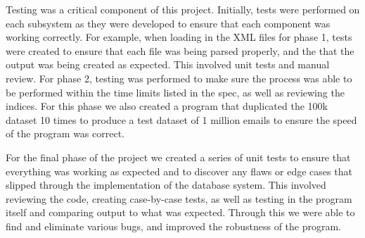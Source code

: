 Testing was a critical component of this project.  Initially, tests were performed on each subsystem as they were developed to ensure that each component was working correctly.  For example, when loading in the XML files for phase 1, tests were created to ensure that each file was being parsed properly, and the that the output was being created as expected.  This involved unit tests and manual review.  For phase 2, testing was performed to make sure the process was able to be performed within the time limits listed in the spec, as well as reviewing the indices.  For this phase we also created a program that duplicated the 100k dataset 10 times to produce a test dataset of 1 million emails to ensure the speed of the program was correct.  

For the final phase of the project we created a series of unit tests to ensure that everything was working as expected and to discover any flaws or edge cases that slipped through the implementation of the database system.  This involved reviewing the code, creating case-by-case tests, as well as testing in the program itself and comparing output to what was expected.  Through this we were able to find and eliminate various bugs, and improved the robustness of the program.   
